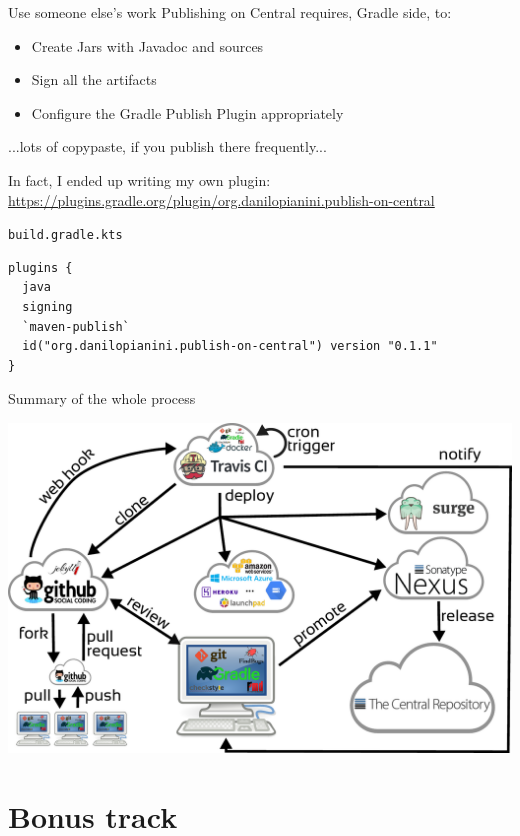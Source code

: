 \documentclass[presentation]{beamer}
\begin{document}
\begin{frame}[fragile]{Use someone else's work}
	Publishing on Central requires, Gradle side, to:
	\begin{itemize}
		\item Create Jars with Javadoc and sources
		\item Sign all the artifacts
		\item Configure the Gradle Publish Plugin appropriately
	\end{itemize}
	...lots of copypaste, if you publish there frequently...

	In fact, I ended up writing my own plugin:
	\url{https://plugins.gradle.org/plugin/org.danilopianini.publish-on-central}
	
    \begin{block}{\texttt{build.gradle.kts}}
		\begin{verbatim}
plugins {
  java
  signing
  `maven-publish`
  id("org.danilopianini.publish-on-central") version "0.1.1"
}
		\end{verbatim}
	\end{block}
\end{frame}

\begin{frame}[fragile]{Summary of the whole process}
	\begin{center}
		\includegraphics[width=.9\textwidth]{images/ci}
	\end{center}
\end{frame}

\section*{Bonus track}
\end{document}
